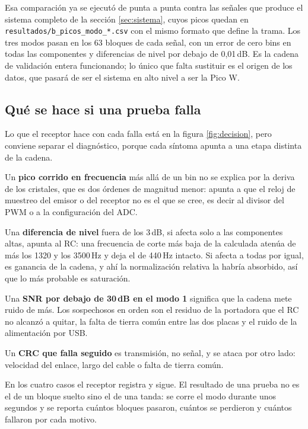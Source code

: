 Esa comparación ya se ejecutó de punta a punta contra las señales que produce el
sistema completo de la sección \ref{sec:sistema}, cuyos picos quedan en
\texttt{resultados/b\_picos\_modo\_*.csv} con el mismo formato que define la trama.
Los tres modos pasan en los 63 bloques de cada señal, con un error de cero bins en
todas las componentes y diferencias de nivel por debajo de 0,01\,dB. Es la cadena
de validación entera funcionando; lo único que falta sustituir es el origen de los
datos, que pasará de ser el sistema en alto nivel a ser la Pico W.

\subsection{Qué se hace si una prueba falla}

Lo que el receptor hace con cada falla está en la figura \ref{fig:decision}, pero
conviene separar el diagnóstico, porque cada síntoma apunta a una etapa distinta
de la cadena.

Un \textbf{pico corrido en frecuencia} más allá de un bin no se explica por la
deriva de los cristales, que es dos órdenes de magnitud menor: apunta a que el
reloj de muestreo del emisor o del receptor no es el que se cree, es decir al
divisor del PWM o a la configuración del ADC.

Una \textbf{diferencia de nivel} fuera de los 3\,dB, si afecta solo a las
componentes altas, apunta al RC: una frecuencia de corte más baja de la calculada
atenúa de más los 1320 y los 3500\,Hz y deja el de 440\,Hz intacto. Si afecta a
todas por igual, es ganancia de la cadena, y ahí la normalización relativa la
habría absorbido, así que lo más probable es saturación.

Una \textbf{SNR por debajo de 30\,dB en el modo 1} significa que la cadena mete
ruido de más. Los sospechosos en orden son el residuo de la portadora que el RC no
alcanzó a quitar, la falta de tierra común entre las dos placas y el ruido de la
alimentación por USB.

Un \textbf{CRC que falla seguido} es transmisión, no señal, y se ataca por otro
lado: velocidad del enlace, largo del cable o falta de tierra común.

En los cuatro casos el receptor registra y sigue. El resultado de una prueba no es
el de un bloque suelto sino el de una tanda: se corre el modo durante unos
segundos y se reporta cuántos bloques pasaron, cuántos se perdieron y cuántos
fallaron por cada motivo.
